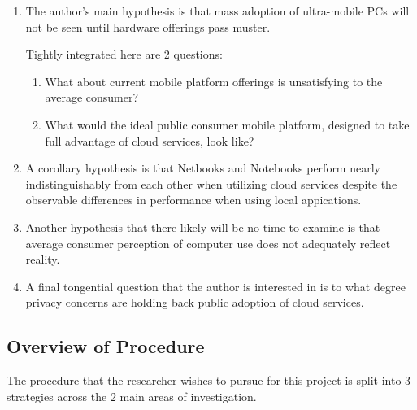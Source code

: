 \documentclass[12pt,oneside,letterpaper]{article}
\begin{document}
\begin{enumerate}

  \item The author's main hypothesis is that mass adoption of ultra-mobile PCs
    will not be seen until hardware offerings pass muster.

  Tightly integrated here are 2 questions:

  \begin{enumerate}

    \item What about current mobile platform offerings is unsatisfying to the
      average consumer?

    \item What would the ideal public consumer mobile platform, designed to take
      full advantage of cloud services, look like?

  \end{enumerate}

  \item A corollary hypothesis is that Netbooks and Notebooks perform nearly
    indistinguishably from each other when utilizing cloud services despite the
    observable differences in performance when using local appications.

  \item Another hypothesis that there likely will be no time to examine is that
    average consumer perception of computer use does not adequately reflect
    reality.

  \item A final tongential question that the author is interested in is to what
    degree privacy concerns are holding back public adoption of cloud services.

\end{enumerate}

\subsection{Overview of Procedure}


The procedure that the researcher wishes to pursue for this project is split
into 3 strategies across the 2 main areas of investigation. %
\end{document}
